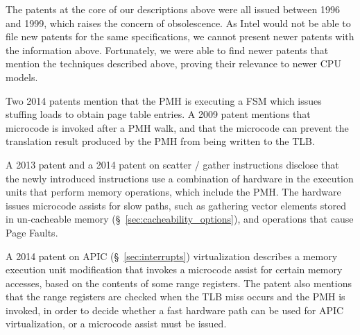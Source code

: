The patents at the core of our descriptions above \cite{intel1996dtlb,
intel1997events, intel1997pmh, intel1999exceptions, intel1999events} were all
issued between 1996 and 1999, which raises the concern of obsolescence. As
Intel would not be able to file new patents for the same specifications, we
cannot present newer patents with the information above. Fortunately, we were
able to find newer patents that mention the techniques described above,
proving their relevance to newer CPU models.


Two 2014 patents \cite{hildesheim2014ptm, raikin2014tlb} mention that the PMH
is executing a FSM which issues stuffing loads to obtain page table entries.
A 2009 patent \cite{intel2009pipeline} mentions that microcode is invoked after
a PMH walk, and that the microcode can prevent the translation result produced
by the PMH from being written to the TLB.


A 2013 patent \cite{intel2013scattergather} and a 2014 patent
\cite{intel2014gather} on scatter / gather instructions disclose that the newly
introduced instructions use a combination of hardware in the execution units
that perform memory operations, which include the PMH. The hardware issues
microcode assists for slow paths, such as gathering vector elements stored in
un-cacheable memory (\S~\ref{sec:cacheability_options}), and operations that
cause Page Faults.


A 2014 patent on APIC (\S~\ref{sec:interrupts}) virtualization
\cite{intel2014vapic} describes a memory execution unit modification that
invokes a microcode assist for certain memory accesses, based on the contents
of some range registers. The patent also mentions that the range registers are
checked when the TLB miss occurs and the PMH is invoked, in order to decide
whether a fast hardware path can be used for APIC virtualization, or a
microcode assist must be issued.

